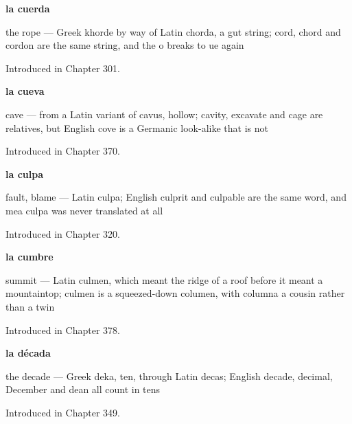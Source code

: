 \noindent\begin{minipage}[t]{\linewidth}
\raggedright
\textbf{la cuerda}\par
\small the rope — Greek khorde by way of Latin chorda, a gut string; cord, chord and cordon are the same string, and the o breaks to ue again\par
\footnotesize Introduced in Chapter 301.
\end{minipage}\par\medskip

\noindent\begin{minipage}[t]{\linewidth}
\raggedright
\textbf{la cueva}\par
\small cave — from a Latin variant of cavus, hollow; cavity, excavate and cage are relatives, but English cove is a Germanic look-alike that is not\par
\footnotesize Introduced in Chapter 370.
\end{minipage}\par\medskip

\noindent\begin{minipage}[t]{\linewidth}
\raggedright
\textbf{la culpa}\par
\small fault, blame — Latin culpa; English culprit and culpable are the same word, and mea culpa was never translated at all\par
\footnotesize Introduced in Chapter 320.
\end{minipage}\par\medskip

\noindent\begin{minipage}[t]{\linewidth}
\raggedright
\textbf{la cumbre}\par
\small summit — Latin culmen, which meant the ridge of a roof before it meant a mountaintop; culmen is a squeezed-down columen, with columna a cousin rather than a twin\par
\footnotesize Introduced in Chapter 378.
\end{minipage}\par\medskip

\noindent\begin{minipage}[t]{\linewidth}
\raggedright
\textbf{la década}\par
\small the decade — Greek deka, ten, through Latin decas; English decade, decimal, December and dean all count in tens\par
\footnotesize Introduced in Chapter 349.
\end{minipage}\par\medskip

